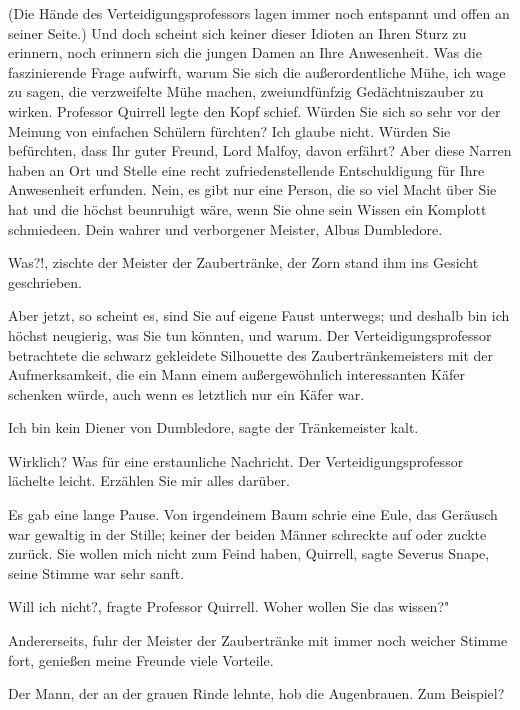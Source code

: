 (Die Hände des Verteidigungsprofessors lagen immer noch entspannt und offen an
seiner Seite.) \glqq{}Und doch scheint sich keiner dieser Idioten an Ihren Sturz
zu erinnern, noch erinnern sich die jungen Damen an Ihre Anwesenheit. Was die
faszinierende Frage aufwirft, warum Sie sich die außerordentliche Mühe, ich wage
zu sagen, die verzweifelte Mühe machen, zweiundfünfzig Gedächtniszauber zu
wirken.\grqq{} Professor Quirrell legte den Kopf schief. \glqq{}Würden Sie sich
so sehr vor der Meinung von einfachen Schülern fürchten? Ich glaube nicht.
Würden Sie befürchten, dass Ihr guter Freund, Lord Malfoy, davon erfährt? Aber
diese Narren haben an Ort und Stelle eine recht zufriedenstellende
Entschuldigung für Ihre Anwesenheit erfunden. Nein, es gibt nur eine Person, die
so viel Macht über Sie hat und die höchst beunruhigt wäre, wenn Sie ohne sein
Wissen ein Komplott schmiedeen. Dein wahrer und verborgener Meister, Albus
Dumbledore.\grqq{}

\glqq{}Was?!\grqq{}, zischte der Meister der Zaubertränke, der Zorn stand ihm ins
Gesicht geschrieben.

\glqq{}Aber jetzt, so scheint es, sind Sie auf eigene Faust unterwegs; und
deshalb bin ich höchst neugierig, was Sie tun könnten, und warum.\grqq{} Der
Verteidigungsprofessor betrachtete die schwarz gekleidete Silhouette des
Zaubertränkemeisters mit der Aufmerksamkeit, die ein Mann einem außergewöhnlich
interessanten Käfer schenken würde, auch wenn es letztlich nur ein Käfer war.

\glqq{}Ich bin kein Diener von Dumbledore\grqq{}, sagte der Tränkemeister kalt.

\glqq{}Wirklich? Was für eine erstaunliche Nachricht.\grqq{} Der
Verteidigungsprofessor lächelte leicht. \glqq{}Erzählen Sie mir alles
darüber.\grqq{}

Es gab eine lange Pause. Von irgendeinem Baum schrie eine Eule, das Geräusch war
gewaltig in der Stille; keiner der beiden Männer schreckte auf oder zuckte
zurück. \glqq{}Sie wollen mich nicht zum Feind haben, Quirrell\grqq{}, sagte
Severus Snape, seine Stimme war sehr sanft.

\glqq{}Will ich nicht?\grqq{}, fragte Professor Quirrell. \glqq{}Woher wollen Sie
das wissen?"

\glqq{}Andererseits\grqq{}, fuhr der Meister der Zaubertränke mit immer noch
weicher Stimme fort, \glqq{}genießen meine Freunde viele Vorteile.\grqq{}

Der Mann, der an der grauen Rinde lehnte, hob die Augenbrauen. \glqq{}Zum
Beispiel?\grqq{}

